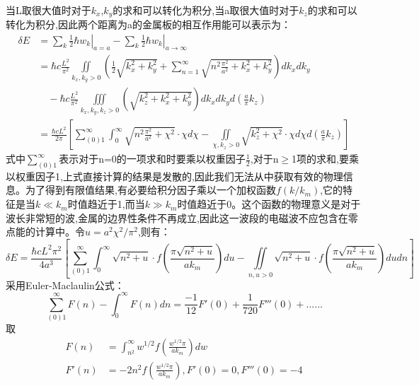 \paragraph*{}
当L取很大值时对于$k_x$,$k_y$的求和可以转化为积分,当a取很大值时对于$k_z$的求和可以转化为积分,因此两个距离为a的金属板的相互作用能可以表示为：
\begin{equation*}
\begin{split}
\delta E &=\left. \sum_k{\frac{1}{2}\hbar w_k} \right|_{a=a} - \left. \sum_k{\frac{1}{2}\hbar w_k} \right|_{a\rightarrow \infty} \\
&= \hbar c\frac{L^2}{\pi ^2} \iint\limits_{k_x,k_y>0}^{} \left( \frac{1}{2}\sqrt{k_{x}^{2}+k_{y}^{2}}+\sum_{n=1}^{\infty}{\sqrt{n^2\frac{\pi ^2}{a^2}+k_{x}^{2}+k_{y}^{2}}} \right) dk_xdk_y  \\ 
&\quad - \hbar c\frac{L^2}{\pi ^2} \iiint\limits_{k_x,k_y,k_z>0}^{} \left( \sqrt{k_{z}^{2}+k_{x}^{2}+k_{y}^{2}} \right) dk_xdk_yd\left( \frac{a}{\pi}k_z \right) \\
&=\frac{\hbar cL^2}{2\pi}\left[ \sum_{\left( 0 \right) 1}^{\infty}{\int_0^{\infty}{\sqrt{n^2\frac{\pi ^2}{a^2}+\chi ^2}\cdot \chi d\chi -\iint\limits_{\chi ,k_z>0}^{}\sqrt{k_{z}^{2}+\chi ^2}\cdot \chi d\chi d\left( \frac{a}{\pi}k_z \right)}} \right]
\end{split}
\end{equation*}
式中$\sum\limits_{(0) 1}^{\infty}{}$表示对于n=0的一项求和时要乘以权重因子$\frac{1}{2}$,对于n$\geqslant$1项的求和,要乘以权重因子1,上式直接计算的结果是发散的,因此我们无法从中获取有效的物理信息。为了得到有限值结果,有必要给积分因子乘以一个加权函数$𝑓(𝑘/𝑘_𝑚 )$,它的特征是当$𝑘≪𝑘_𝑚$时值趋近于1,而当$𝑘≫𝑘_𝑚$时值趋近于0。这个函数的物理意义是对于波长非常短的波,金属的边界性条件不再成立,因此这一波段的电磁波不应包含在零点能的计算中。令$u=a^2\chi ^2/\pi ^2$,则有：
$$
\delta E=\frac{\hbar cL^2\pi ^2}{4a^3}\left[ \sum_{\left( 0 \right) 1}^{\infty}{\int_0^{\infty}{\sqrt{n^2+u}\cdot f\left( \frac{\pi \sqrt{n^2+u}}{ak_m} \right) du - \iint\limits_{n,u>0}^{} \sqrt{n^2+u}\cdot f\left( \frac{\pi \sqrt{n^2+u}}{ak_m} \right) dudn}} \right] 
$$
采用Euler-Maclaulin公式：
$$
\sum_{\left( 0 \right) 1}^{\infty}{F\left( n \right)}-\int_0^{\infty}{F\left( n \right) dn}=\frac{-1}{12}F'\left( 0 \right) +\frac{1}{720}F'''\left( 0 \right) +......
$$
取
\begin{equation*}
\begin{split}
F\left( n \right) &=\int_{n^2}^{\infty}{w^{1/2}f\left( \frac{w^{1/2}\pi}{ak_m} \right) dw} \\
F'\left( n \right) &=-2n^2f\left( \frac{w^{1/2}\pi}{ak_m} \right) ,F'\left( 0 \right) =0,F'''\left( 0 \right) =-4
\end{split}
\end{equation*}
